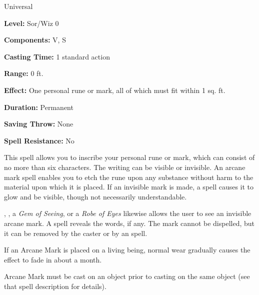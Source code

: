 
Universal

\textbf{Level:} Sor/Wiz 0

\textbf{Components:} V, S

\textbf{Casting Time:} 1 standard action

\textbf{Range:} 0 ft.

\textbf{Effect:} One personal rune or mark, all of which must fit within 1 sq. 
ft.

\textbf{Duration:} Permanent

\textbf{Saving Throw:} None

\textbf{Spell Resistance:} No

This spell allows you to inscribe your personal rune or mark, which can consist 
of no more than six characters. The writing can be visible or invisible. An arcane 
mark spell enables you to etch the rune upon any substance without harm to the 
material upon which it is placed. If an invisible mark is made, a  spell causes it to glow and be visible, though not necessarily understandable.

, , a \textit{Gem of Seeing}, or a \textit{Robe of Eyes} likewise allows the user to see an invisible arcane mark. A  spell reveals the words, if any. The mark cannot be dispelled, but it can 
be removed by the caster or by an  spell.

If an Arcane Mark is placed on a living being, normal wear gradually causes 
the effect to fade in about a month.

Arcane Mark must be cast on an object prior to casting  on the same object (see that spell description for details).

